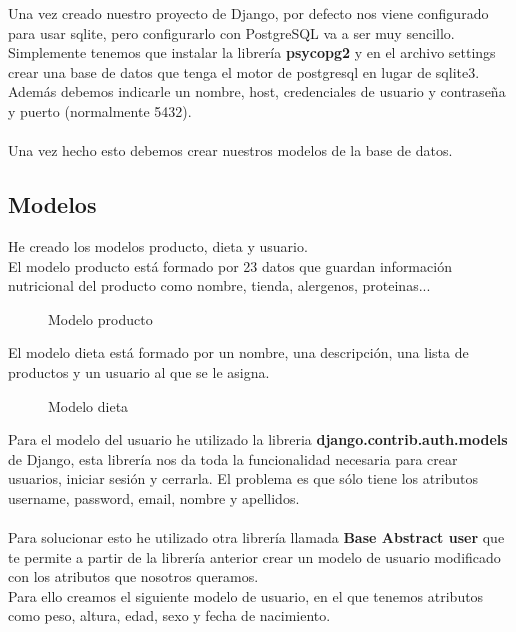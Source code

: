 Una vez creado nuestro proyecto de Django, por defecto nos viene configurado para usar sqlite, pero configurarlo con PostgreSQL va a ser muy sencillo.
Simplemente tenemos que instalar la librería \textbf{psycopg2} y en el archivo settings crear una base de datos que tenga el motor de postgresql en lugar de sqlite3.
Además debemos indicarle un nombre, host, credenciales de usuario y contraseña y puerto (normalmente 5432).\\ \\

Una vez hecho esto debemos crear nuestros modelos de la base de datos.

\subsection{Modelos}

He creado los modelos producto, dieta y usuario.\\
El modelo producto está formado por 23 datos que guardan información nutricional del producto como nombre, tienda, alergenos, proteinas...

\begin{figure}[H]
  \centering
  \noindent{}
  \caption{Modelo producto}
\end{figure}

El modelo dieta está formado por un nombre, una descripción, una lista de productos y un usuario al que se le asigna.

\begin{figure}[H]
  \centering
  \noindent{}
  \caption{Modelo dieta}
\end{figure}

Para el modelo del usuario he utilizado la libreria \textbf{django.contrib.auth.models} de Django, 
esta librería nos da toda la funcionalidad necesaria para crear usuarios, iniciar sesión y cerrarla. 
El problema es que sólo tiene los atributos username, password, email, nombre y apellidos.\\\\

Para solucionar esto he utilizado otra librería llamada \textbf{Base Abstract user} que te permite a partir 
de la librería anterior crear un modelo de usuario modificado con los atributos que nosotros queramos.\\

Para ello creamos el siguiente modelo de usuario, en el que tenemos atributos como peso, altura, edad, sexo y fecha de nacimiento.

